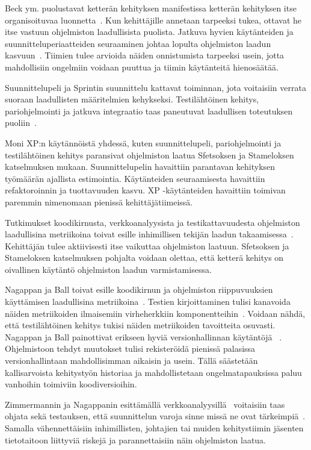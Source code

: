 \documentclass[finnish]{../tktltiki2}
\theoremstyle{definition}
\theoremstyle{remark}
\begin{document}
    Beck ym. puolustavat ketterän kehityksen manifestissa ketterän kehityksen itse organisoituvaa 
luonnetta~\cite{BBB01}. Kun kehittäjille annetaan tarpeeksi tukea, ottavat he itse vastuun ohjelmiston laadullisista 
puolista. Jatkuva hyvien käytänteiden ja suunnitteluperiaatteiden seuraaminen johtaa lopulta ohjelmiston laadun 
kasvuun~\cite{SS10}. Tiimien tulee arvioida näiden onnistumista tarpeeksi usein, jotta mahdollisiin ongelmiin voidaan 
puuttua ja tiimin käytänteitä hienosäätää.

    Suunnittelupeli ja Sprintin suunnittelu kattavat toiminnan, jota voitaisiin verrata suoraan laadullisten
määritelmien kehykseksi. Testilähtöinen kehitys, pariohjelmointi ja jatkuva integraatio taas paneutuvat laadullisen 
toteutuksen puoliin~\cite{SS10}.

    Moni XP:n käytännöistä yhdessä, kuten suunnittelupeli, pariohjelmointi ja testilähtöinen kehitys paransivat 
ohjelmiston laatua Sfetsoksen ja Stameloksen katselmuksen mukaan. Suunnittelupelin havaittiin parantavan kehityksen 
työmäärän ajallista estimointia. Käytänteiden seuraamisesta havaittiin refaktoroinnin ja tuottavuuden kasvu. XP 
-käytänteiden havaittiin toimivan paremmin nimenomaan pienissä kehittäjätiimeissä.

    Tutkimukset koodikirnusta, verkkoanalyysista ja testikattavuudesta ohjelmiston laadullisina metriikoina toivat 
esille inhimillisen tekijän laadun takaamisessa~\cite{NB05, ZN08, MNDT09}. Kehittäjän tulee aktiivisesti itse vaikuttaa 
ohjelmiston laatuun. Sfetsoksen ja Stameloksen katselmuksen pohjalta voidaan olettaa, että ketterä kehitys on oivallinen 
käytäntö ohjelmiston laadun varmistamisessa.

    Nagappan ja Ball toivat esille koodikirnun ja ohjelmiston riippuvuuksien käyttämisen laadullisina 
metriikoina~\cite{NB05, NB07}. Testien kirjoittaminen tulisi kanavoida näiden metriikoiden ilmaisemiin virheherkkiin 
komponentteihin~\cite{MNDT09}. Voidaan nähdä, että testilähtöinen kehitys tukisi näiden metriikoiden tavoitteita 
osuvasti. Nagappan ja Ball painottivat erikseen hyviä versionhallinnan käytäntöjä ~\cite{NB05}. Ohjelmistoon tehdyt 
muutokset tulisi rekisteröidä pienissä palasissa versionhallintaan mahdollisimman aikaisin ja usein. Tällä säästetään 
kallisarvoista kehitystyön historiaa ja mahdollistetaan ongelmatapauksissa paluu vanhoihin toimiviin koodiversioihin.

    Zimmermannin ja Nagappanin esittämällä verkkoanalyysillä~\cite{ZN08} voitaisiin taas ohjata sekä testauksen, että 
suunnittelun varoja sinne missä ne ovat tärkeimpiä~\cite{NB07, MNDT09}. Samalla vähennettäisiin inhimillisten, johtajien 
tai muiden kehitystiimin jäsenten tietotaitoon liittyviä riskejä ja parannettaisiin näin ohjelmiston laatua.
\end{document}
